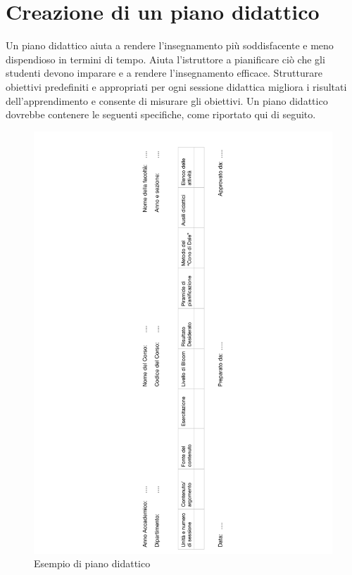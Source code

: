 \section{Creazione di un piano didattico}
\label{sec:problem}
Un piano didattico aiuta a rendere l'insegnamento più soddisfacente e meno dispendioso in termini di tempo. Aiuta l'istruttore a pianificare ciò che gli studenti devono imparare e a rendere l'insegnamento efficace. Strutturare obiettivi predefiniti e appropriati per ogni sessione didattica migliora i risultati dell'apprendimento e consente di misurare gli obiettivi. Un piano didattico dovrebbe contenere le seguenti specifiche, come riportato qui di seguito.
\begin{figure}[h!]
  \centerline{\includegraphics[height = 17 cm, width= 5 cm, angle=270, trim= 7cm 0 7cm 0]{figures/piano.pdf}}
  \caption{Esempio di piano didattico}
\end{figure}

